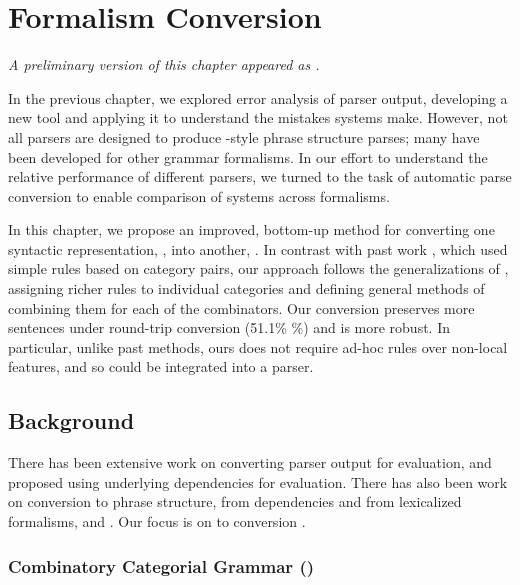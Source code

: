 \chapter{Formalism Conversion} \label{chp:conversion}

\begin{center}
\textit{
  A preliminary version of this chapter appeared as \textcite{Kummerfeld-etal:2012:ACL}.
}
\end{center}

In the previous chapter, we explored error analysis of \ptb parser output, developing a new tool and applying it to understand the mistakes systems make.
However, not all parsers are designed to produce \ptb-style phrase structure parses; many have been developed for other grammar formalisms.
In our effort to understand the relative performance of different parsers, we turned to the task of automatic parse conversion to enable comparison of systems across formalisms.

In this chapter, we propose an improved, bottom-up method for converting one syntactic representation, \ccg, into another, \ptb.
In contrast with past work \parencite{Clark-Curran:2009}, which used simple rules based on category pairs, our approach follows the generalizations of \ccg, assigning richer rules to individual categories and defining general methods of combining them for each of the \ccg combinators.
Our conversion preserves more sentences under round-trip conversion (51.1\% \%) and is more robust.
In particular, unlike past methods, ours does not require ad-hoc rules over non-local features, and so could be integrated into a parser.

\section{Background}

There has been extensive work on converting parser output for evaluation, \myeg
\textcite{Lin:1998} and \textcite{Briscoe-Carroll-Graham-Copestake:2002} proposed
using underlying dependencies for evaluation.  There has also been work on
conversion to phrase structure, from dependencies \parencite{Xia:2001,Xia:2009} and
from lexicalized formalisms, \myeg \hpsg \parencite{Matsuzaki-Tsujii:2008} and \mytag
\parencite{Chiang:2000,Sarkar:2001}. Our focus is on \ccg to \ptb conversion
\parencite{Clark-Curran:2009}.

\subsection{Combinatory Categorial Grammar (\ccg)}

